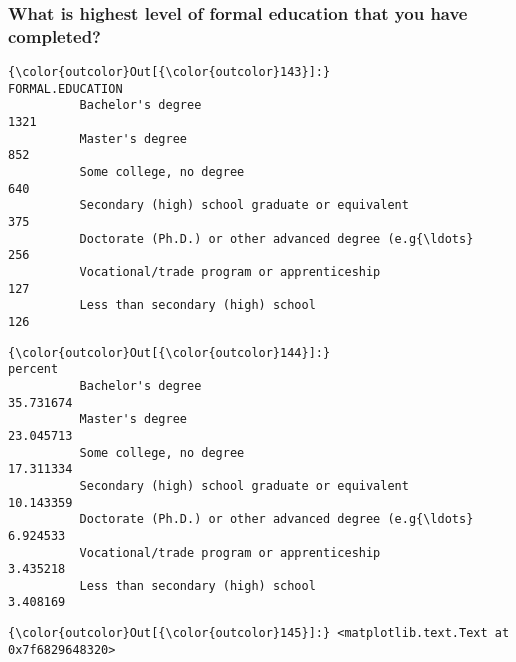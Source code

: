 \documentclass[11pt]{article}
\begin{document}
    \subsubsection{What is highest level of formal education that you have
completed?}\label{what-is-highest-level-of-formal-education-that-you-have-completed}


            \begin{Verbatim}[commandchars=\\\{\}]
{\color{outcolor}Out[{\color{outcolor}143}]:}                                                     FORMAL.EDUCATION
          Bachelor's degree                                               1321
          Master's degree                                                  852
          Some college, no degree                                          640
          Secondary (high) school graduate or equivalent                   375
          Doctorate (Ph.D.) or other advanced degree (e.g{\ldots}               256
          Vocational/trade program or apprenticeship                       127
          Less than secondary (high) school                                126
\end{Verbatim}
        

            \begin{Verbatim}[commandchars=\\\{\}]
{\color{outcolor}Out[{\color{outcolor}144}]:}                                                       percent
          Bachelor's degree                                   35.731674
          Master's degree                                     23.045713
          Some college, no degree                             17.311334
          Secondary (high) school graduate or equivalent      10.143359
          Doctorate (Ph.D.) or other advanced degree (e.g{\ldots}   6.924533
          Vocational/trade program or apprenticeship           3.435218
          Less than secondary (high) school                    3.408169
\end{Verbatim}
        

            \begin{Verbatim}[commandchars=\\\{\}]
{\color{outcolor}Out[{\color{outcolor}145}]:} <matplotlib.text.Text at 0x7f6829648320>
\end{Verbatim}
        
    \begin{center}
    \end{center}
    { \hspace*{\fill} \\}
    
\end{document}
